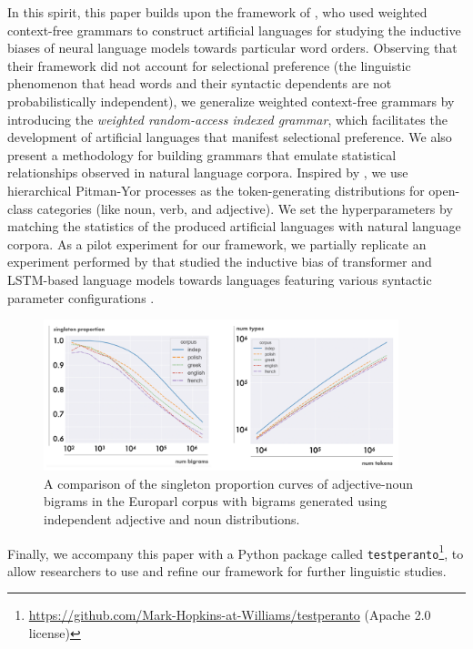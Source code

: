 \documentclass[11pt]{article}
\begin{document}
In this spirit, this paper builds upon the framework of \citet{white-cotterell-2021-examining}, who used weighted context-free grammars to construct artificial languages for studying the inductive biases of neural language models towards particular word orders. Observing that their framework did not account for selectional preference (the linguistic  phenomenon that head words and their syntactic dependents are not probabilistically independent), we generalize weighted context-free grammars by introducing the \emph{weighted random-access indexed grammar}, which facilitates the development of artificial languages that manifest selectional preference. We also present a methodology for building grammars that emulate statistical relationships observed in natural language corpora. Inspired by \citet{teh-2006-hierarchical}, we use hierarchical Pitman-Yor processes \cite{pitman1997two} as the token-generating distributions for open-class categories (like noun, verb, and adjective). We set the hyperparameters by matching the statistics of the produced artificial languages with natural language corpora. As a pilot experiment for our framework, we partially replicate an experiment performed by \citet{white-cotterell-2021-examining} that studied the inductive bias of transformer and LSTM-based language models towards languages featuring various syntactic parameter configurations \cite{chomsky1981principles,baker2008atoms}.



\begin{figure}[tb]
\centering
\includegraphics[width=0.92\textwidth]{images/demo_plots.png}
\caption{A comparison of the singleton proportion curves of adjective-noun bigrams in the Europarl corpus with bigrams generated using independent adjective and noun distributions.}
\label{fig:motivationcurve}
\end{figure}



Finally, we accompany this paper with a Python package called \texttt{testperanto}\footnote{\url{https://github.com/Mark-Hopkins-at-Williams/testperanto} (Apache 2.0 license)}, to allow researchers to use and refine our framework for further linguistic studies.
\end{document}
